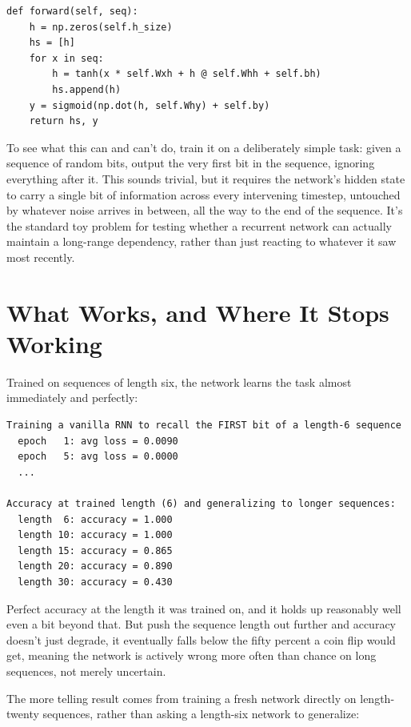 \begin{Verbatim}[fontsize=\small, frame=single, xleftmargin=1em, xrightmargin=1em]
def forward(self, seq):
    h = np.zeros(self.h_size)
    hs = [h]
    for x in seq:
        h = tanh(x * self.Wxh + h @ self.Whh + self.bh)
        hs.append(h)
    y = sigmoid(np.dot(h, self.Why) + self.by)
    return hs, y
\end{Verbatim}

To see what this can and can't do, train it on a deliberately simple task: given a sequence of random bits, output the very first bit in the sequence, ignoring everything after it. This sounds trivial, but it requires the network's hidden state to carry a single bit of information across every intervening timestep, untouched by whatever noise arrives in between, all the way to the end of the sequence. It's the standard toy problem for testing whether a recurrent network can actually maintain a long-range dependency, rather than just reacting to whatever it saw most recently.

\section*{What Works, and Where It Stops Working}

Trained on sequences of length six, the network learns the task almost immediately and perfectly:

\begin{Verbatim}[fontsize=\small, frame=single, xleftmargin=1em, xrightmargin=1em]
Training a vanilla RNN to recall the FIRST bit of a length-6 sequence
  epoch   1: avg loss = 0.0090
  epoch   5: avg loss = 0.0000
  ...

Accuracy at trained length (6) and generalizing to longer sequences:
  length  6: accuracy = 1.000
  length 10: accuracy = 1.000
  length 15: accuracy = 0.865
  length 20: accuracy = 0.890
  length 30: accuracy = 0.430
\end{Verbatim}

Perfect accuracy at the length it was trained on, and it holds up reasonably well even a bit beyond that. But push the sequence length out further and accuracy doesn't just degrade, it eventually falls below the fifty percent a coin flip would get, meaning the network is actively wrong more often than chance on long sequences, not merely uncertain.

The more telling result comes from training a fresh network directly on length-twenty sequences, rather than asking a length-six network to generalize:

